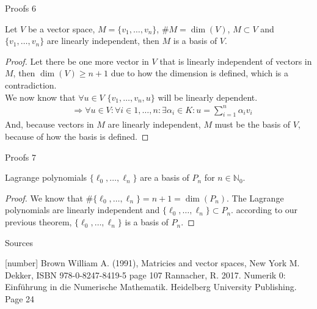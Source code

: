\documentclass[8pt]{beamer}
\begin{document}
		\begin{frame}{Proofs 6}
			\begin{theorem}
				Let $V$ be a vector space, $M = \{v_1, \ldots, v_n\}$, $\# M = \dim(V)$, $M \subset V$ and $\{v_1, \ldots, v_n\}$ are linearly independent, then $M$ is a basis of $V$.
			\end{theorem}
			\begin{proof}
				Let there be one more vector in $V$ that is linearly independent of vectors in $M$, then $\dim(V) \geq n+1$ due to how the dimension is defined, which is a contradiction.\\ 
				We now know that $\forall u \in V$ $\{v_1, \ldots, v_n, u\}$ will be linearly dependent.
				\begin{align*}
					&\Rightarrow \forall u \in V: \forall i \in 1, \ldots, n: \exists \alpha_i \in K : u = \sum_{i = 1}^{n}\alpha_i v_i 
				\end{align*}
				And, because vectors in $M$ are linearly independent, $M$ must be the basis of $V$, because of how the basis is defined.
			\end{proof}
		\end{frame}
											
		\begin{frame}{Proofs 7}
			\begin{theorem}
				Lagrange polynomials $\{\ell_0,\ldots, \ell_n\}$ are a basis of $P_n$ for $n \in \mathbb{N}_0$.
			\end{theorem}
			\begin{proof}
				We know that $\#\{\ell_0,\ldots, \ell_n\} = n+1 = \dim(P_n)$. The Lagrange polynomials are linearly independent and $\{\ell_0,\ldots, \ell_n\} \subset P_n$. according to our previous theorem, $\{\ell_0,\ldots, \ell_n\}$ is a basis of $P_n$.
			\end{proof}
		\end{frame}
		\begin{frame}{Sources}
			\begin{thebibliography}{9}
				[number]
				Brown William A. (1991), Matricies and vector spaces, New York M. Dekker, ISBN 978-0-8247-8419-5 page 107
				Rannacher, R. 2017. Numerik 0: Einführung in die Numerische Mathematik. Heidelberg University Publishing. Page 24
			\end{thebibliography}
		\end{frame}
													
\end{document}
